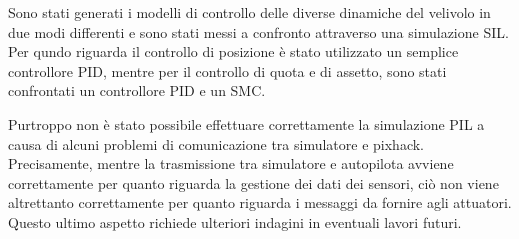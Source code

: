 Sono stati generati i modelli di controllo delle diverse dinamiche del velivolo in due modi differenti e sono stati messi a confronto attraverso una simulazione SIL. Per qundo riguarda il controllo di posizione è stato utilizzato un semplice controllore PID, mentre per il controllo di quota e di assetto, sono stati confrontati un controllore PID e un SMC. 

Purtroppo non è stato possibile effettuare correttamente la simulazione PIL a causa di alcuni problemi di comunicazione tra simulatore e pixhack. Precisamente, mentre la trasmissione tra simulatore e autopilota avviene correttamente per quanto riguarda la gestione dei dati dei sensori, ciò non viene altrettanto correttamente per quanto riguarda i messaggi da fornire agli attuatori. Questo ultimo aspetto richiede ulteriori indagini in eventuali lavori futuri.